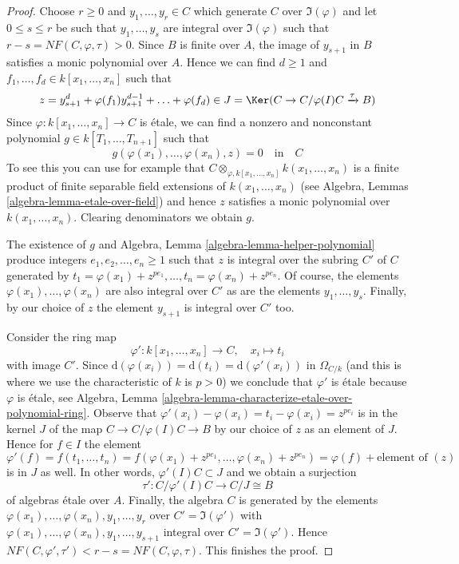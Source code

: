 \begin{proof}
Choose $r \geq 0$ and $y_1, \ldots, y_r \in C$ which generate
$C$ over $\Im(\varphi)$ and let $0 \leq s \leq r$ be such that
$y_1, \ldots, y_s$ are integral over $\Im(\varphi)$
such that $r - s = NF(C, \varphi, \tau) > 0$.
Since $B$ is finite over $A$, the image of $y_{s + 1}$ in $B$
satisfies a monic polynomial over $A$. Hence we can find
$d \geq 1$ and $f_1, \ldots, f_d \in k[x_1, \ldots, x_n]$
such that
$$
z = y_{s + 1}^d + \varphi(f_1) y_{s + 1}^{d - 1} + \ldots + \varphi(f_d) \in
J = \Ker(C \to C/\varphi(I)C \xrightarrow{\tau} B)
$$
Since $\varphi : k[x_1, \ldots, x_n] \to C$ is \'etale, we can find a
nonzero and nonconstant polynomial $g \in k[T_1, \ldots, T_{n + 1}]$
such that
$$
g(\varphi(x_1), \ldots, \varphi(x_n), z) = 0
\quad\text{in}\quad
C
$$
To see this you can use for example that
$C \otimes_{\varphi, k[x_1, \ldots, x_n]} k(x_1, \ldots, x_n)$
is a finite product of finite separable field extensions
of $k(x_1, \ldots, x_n)$
(see Algebra, Lemmas \ref{algebra-lemma-etale-over-field})
and hence $z$ satisfies a monic
polynomial over $k(x_1, \ldots, x_n)$. Clearing denominators
we obtain $g$.

\medskip\noindent
The existence of $g$ and
Algebra, Lemma \ref{algebra-lemma-helper-polynomial}
produce integers $e_1, e_2, \ldots, e_n \geq 1$ such that
$z$ is integral over the subring $C'$ of $C$ generated by
$t_1 = \varphi(x_1) + z^{pe_1}, \ldots, t_n = \varphi(x_n) + z^{pe_n}$.
Of course, the elements $\varphi(x_1), \ldots, \varphi(x_n)$
are also integral over $C'$ as are the elements
$y_1, \ldots, y_s$. Finally, by our choice of $z$ the element
$y_{s + 1}$ is integral over $C'$ too.

\medskip\noindent
Consider the ring map
$$
\varphi' : k[x_1, \ldots, x_n] \longrightarrow C, \quad
x_i \longmapsto t_i
$$
with image $C'$. Since
$\text{d}(\varphi(x_i)) = \text{d}(t_i) = \text{d}(\varphi'(x_i))$
in $\Omega_{C/k}$ (and this is where we use the characteristic of $k$
is $p > 0$) we conclude that $\varphi'$ is \'etale because $\varphi$ is
\'etale, see
Algebra, Lemma \ref{algebra-lemma-characterize-etale-over-polynomial-ring}.
Observe that $\varphi'(x_i) - \varphi(x_i) = t_i - \varphi(x_i) = z^{pe_i}$
is in the kernel $J$ of the map $C \to C/\varphi(I)C \to B$ by our
choice of $z$ as an element of $J$.
Hence for $f \in I$ the element
$$
\varphi'(f) =
f(t_1, \ldots, t_n) =
f(\varphi(x_1) + z^{pe_1}, \ldots, \varphi(x_n) + z^{pe_n}) =
\varphi(f) + \text{element of }(z)
$$
is in $J$ as well. In other words, $\varphi'(I)C \subset J$ and
we obtain a surjection
$$
\tau' : C/\varphi'(I)C \longrightarrow C/J \cong B
$$
of algebras \'etale over $A$. Finally, the algebra
$C$ is generated by the elements
$\varphi(x_1), \ldots, \varphi(x_n), y_1, \ldots, y_r$
over $C' = \Im(\varphi')$ with
$\varphi(x_1), \ldots, \varphi(x_n), y_1, \ldots, y_{s + 1}$
integral over $C' = \Im(\varphi')$. Hence
$NF(C, \varphi', \tau') < r - s = NF(C, \varphi, \tau)$.
This finishes the proof.
\end{proof}

